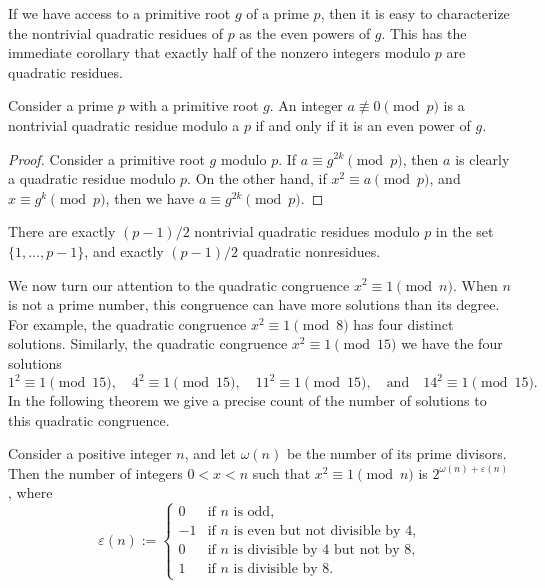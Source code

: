 If we have access to a primitive root $g$ of a prime $p$, then it is easy to characterize the nontrivial quadratic residues of $p$ as the even powers of $g$. This has the immediate corollary that exactly half of the nonzero integers modulo $p$ are quadratic residues.

\begin{proposition}\label{proposition:quadratic-residue-pairity-exponent-primitive-root}
  Consider a prime $p$ with a primitive root $g$. An integer $a\nequiv 0\pmod{p}$ is a nontrivial quadratic residue modulo a $p$ if and only if it is an even power of $g$.
\end{proposition}

\begin{proof}
  Consider a primitive root $g$ modulo $p$. If $a\equiv g^{2k}\pmod{p}$, then $a$ is clearly a quadratic residue modulo $p$. On the other hand, if $x^2\equiv a\pmod{p}$, and $x\equiv g^k\pmod{p}$, then we have $a\equiv g^{2k}\pmod{p}$.
\end{proof}

\begin{corollary}
  There are exactly $(p-1)/2$ nontrivial quadratic residues modulo $p$ in the set $\{1,\ldots,p-1\}$, and exactly $(p-1)/2$ quadratic nonresidues.
\end{corollary}

We now turn our attention to the quadratic congruence $x^2\equiv 1\pmod{n}$. When $n$ is not a prime number, this congruence can have more solutions than its degree. For example, the quadratic congruence $x^2\equiv 1\pmod{8}$ has four distinct solutions. Similarly, the quadratic congruence $x^2\equiv 1\pmod{15}$ we have the four solutions
\begin{equation*}
  1^2\equiv 1\pmod{15},\quad 4^2\equiv 1\pmod{15},\quad 11^2\equiv 1\pmod{15},\quad\text{and}\quad 14^2\equiv 1\pmod{15}.
\end{equation*}
In the following theorem we give a precise count of the number of solutions to this quadratic congruence.

\begin{theorem}
  Consider a positive integer $n$, and let $\omega(n)$ be the number of its prime divisors. Then the number of integers $0<x<n$ such that $x^2\equiv 1\pmod{n}$ is $2^{\omega(n)+\varepsilon(n)}$, where
  \begin{equation*}
    \varepsilon(n):=
    \begin{cases}
      0 & \text{if $n$ is odd,}\\
      -1 & \text{if $n$ is even but not divisible by $4$,}\\
      0 & \text{if $n$ is divisible by $4$ but not by $8$,}\\
      1 & \text{if $n$ is divisible by $8$.}
    \end{cases}
  \end{equation*}
\end{theorem}

